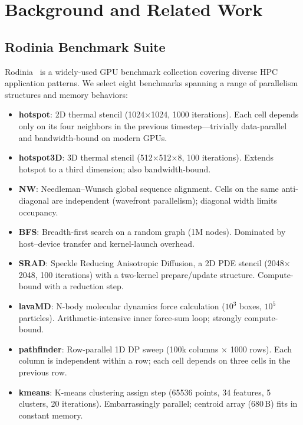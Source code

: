 \documentclass[conference]{IEEEtran}
\begin{document}
\section{Background and Related Work}

\subsection{Rodinia Benchmark Suite}
Rodinia~\cite{che2009rodinia} is a widely-used GPU benchmark collection covering
diverse HPC application patterns. We select eight benchmarks spanning a range of
parallelism structures and memory behaviors:

\begin{itemize}
  \item \textbf{hotspot}: 2D thermal stencil (1024$\times$1024, 1000
        iterations). Each cell depends only on its four neighbors in the
        previous timestep---trivially data-parallel and bandwidth-bound on
        modern GPUs.
  \item \textbf{hotspot3D}: 3D thermal stencil (512$\times$512$\times$8, 100
        iterations). Extends hotspot to a third dimension; also bandwidth-bound.
  \item \textbf{NW}: Needleman--Wunsch global sequence alignment. Cells on the
        same anti-diagonal are independent (wavefront parallelism); diagonal
        width limits occupancy.
  \item \textbf{BFS}: Breadth-first search on a random graph (1M nodes).
        Dominated by host--device transfer and kernel-launch overhead.
  \item \textbf{SRAD}: Speckle Reducing Anisotropic Diffusion, a 2D PDE stencil
        (2048$\times$2048, 100 iterations) with a two-kernel prepare/update
        structure. Compute-bound with a reduction step.
  \item \textbf{lavaMD}: N-body molecular dynamics force calculation
        ($10^3$ boxes, $10^5$ particles). Arithmetic-intensive inner
        force-sum loop; strongly compute-bound.
  \item \textbf{pathfinder}: Row-parallel 1D DP sweep
        (100k columns $\times$ 1000 rows). Each column is independent within a
        row; each cell depends on three cells in the previous row.
  \item \textbf{kmeans}: K-means clustering assign step (65536 points,
        34 features, 5 clusters, 20 iterations). Embarrassingly parallel;
        centroid array (680\,B) fits in constant memory.
\end{itemize}
\end{document}
